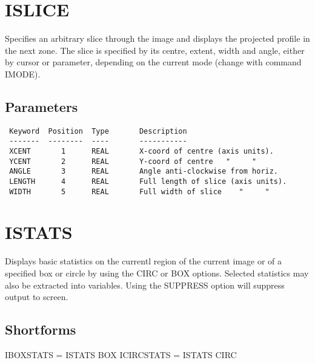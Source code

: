 \documentclass{book}
\renewcommand{\_}{{\tt\char'137}}     %
\begin{document}
\section{ISLICE}
Specifies an arbitrary slice through the image and displays the
projected profile in the next zone. The slice is specified by
its centre, extent, width and angle, either by cursor or parameter,
depending on the current mode (change with command IMODE).

\subsection{Parameters}
\begin{verbatim}
 Keyword  Position  Type       Description
 -------  --------  ----       -----------
 XCENT       1      REAL       X-coord of centre (axis units).
 YCENT       2      REAL       Y-coord of centre   "     "
 ANGLE       3      REAL       Angle anti-clockwise from horiz.
 LENGTH      4      REAL       Full length of slice (axis units).
 WIDTH       5      REAL       Full width of slice    "     "

\end{verbatim}\section{ISTATS}
Displays basic statistics on the currentl region of the current
image or of a specified box or circle by using the CIRC or BOX
options. Selected statistics may also be extracted into
variables. Using the SUPPRESS option will suppress output to
screen.

\subsection{Shortforms}
IBOXSTATS = ISTATS BOX
ICIRCSTATS = ISTATS CIRC
\end{document}
